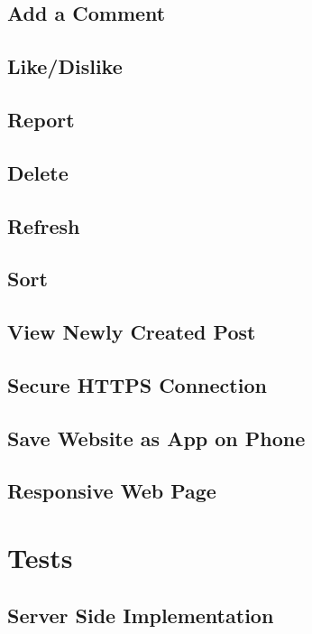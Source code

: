 \documentclass[12pt]{article}
\begin{document}
      \subsection{Add a Comment}

      \subsection{Like/Dislike}

      \subsection{Report}

      \subsection{Delete}

      \subsection{Refresh}

      \subsection{Sort}

      \subsection{View Newly Created Post}

      \subsection{Secure HTTPS Connection}

      \subsection{Save Website as App on Phone}

      \subsection{Responsive Web Page}

\section{Tests}
\subsection{Server Side Implementation}
\end{document}
